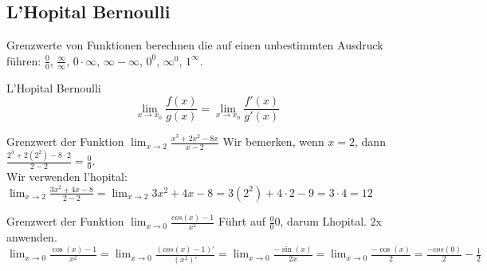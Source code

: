 \documentclass[a4paper]{article}
\begin{document}
\subsection{L'Hopital Bernoulli}
Grenzwerte von Funktionen berechnen die auf einen unbestimmten Ausdruck führen: $\frac{0}{0}$, $\frac{\infty}{\infty}$, $0 \cdot \infty$, $\infty - \infty$, $0^0$, $\infty^0$, $1^{\infty}$.


\begin{mainbox}{L'Hopital Bernoulli}
  \[\lim_{x \rightarrow x_0} \frac{f(x)}{g(x)} = \lim_{x \rightarrow x_0} \frac{f'(x)}{g'(x)}\]

\end{mainbox}

\begin{bspbox}{Grenzwert der Funktion $\lim_{x \to 2} \frac{x^3 + 2x^2 -8x}{x-2}$}
    Wir bemerken, wenn $x = 2$, dann $\frac{2^3 + 2(2^2) -8\cdot2}{2-2} = \frac{0}{0}$. \\
    Wir verwenden l'hopital: $\lim_{x \to 2} \frac{3x^2 + 4x - 8}{2-2} = \lim_{x \to 2} 3x^2 + 4x -8 = 3(2^2)+4\cdot2-9 = 3 \cdot 4 = 12$ 
\end{bspbox}

\begin{bspbox}{Grenzwert der Funktion $\lim_{x \to 0} \frac{cos(x)-1}{x^2}$}
  Führt auf $\frac{0}{0}$0, darum Lhopital. 2x anwenden. \\
  $\lim_{x \to 0} \frac{\cos(x)-1}{x^2} = \lim_{x \to 0} \frac{(cos(x)-1)'}{(x^2)'} = \lim_{x \to 0} \frac{-\sin(x)}{2x} = \lim_{x \to 0} \frac{-\cos(x)}{2} = \frac{-cos(0)}{2} -\frac{1}{2}$ 
\end{bspbox}
\end{document}
